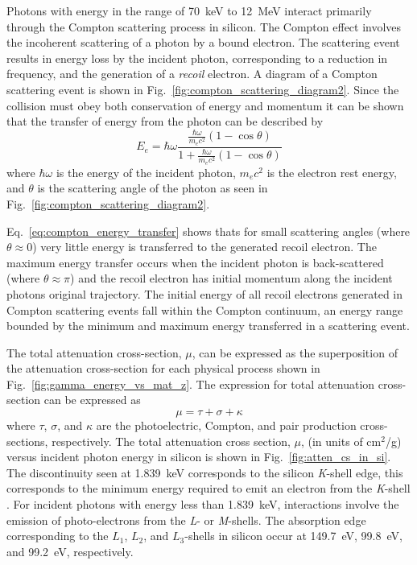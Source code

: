 Photons with energy in the range of 70~keV to 12~MeV interact primarily through the Compton scattering process in silicon.
The Compton effect involves the incoherent scattering of a photon by a bound electron.
The scattering event results in energy loss by the incident photon, corresponding to a reduction in frequency, and the generation of a \emph{recoil} electron.
A diagram of a Compton scattering event is shown in Fig.~\ref{fig:compton_scattering_diagram2}.
Since the collision must obey both conservation of energy and momentum it can be shown that the transfer of energy from the photon can be described by
\begin{equation}
    \label{eq:compton_energy_transfer}
    E_{e} = \hbar \omega \frac{\frac{\hbar \omega}{m_{e} c^2}(1-\cos\theta)}{1 + \frac{\hbar \omega}{m_e c^2}(1-\cos\theta)}
\end{equation}
where $\hbar \omega$ is the energy of the incident photon, $m_{e}c^2$ is the electron rest energy, and $\theta$ is the scattering angle of the photon as seen in Fig.~\ref{fig:compton_scattering_diagram2}.

Eq.~\ref{eq:compton_energy_transfer} shows thats for small scattering angles (where $\theta \approx 0$) very little energy is transferred to the generated recoil electron.
The maximum energy transfer occurs when the incident photon is back-scattered (where $\theta \approx \pi$) and the recoil electron has initial momentum along the incident photons original trajectory.
The initial energy of all recoil electrons generated in Compton scattering events fall within the Compton continuum, an energy range bounded by the minimum and maximum energy transferred in a scattering event.

The total attenuation cross-section, $\mu$, can be expressed as the superposition of the attenuation cross-section for each physical process shown in Fig.~\ref{fig:gamma_energy_vs_mat_z}.
The expression for total attenuation cross-section can be expressed as 
\begin{equation}
    \label{eq:total_photon_cs}
    \mu = \tau + \sigma + \kappa
\end{equation}
where $\tau$, $\sigma$, and $\kappa$ are the photoelectric, Compton, and pair production cross-sections, respectively.
The total attenuation cross section, $\mu$, (in units of cm$^2$/g) versus incident photon energy in silicon is shown in Fig.~\ref{fig:atten_cs_in_si}.
The discontinuity seen at 1.839~keV corresponds to the silicon \emph{K}-shell edge, this corresponds to the minimum energy required to emit an electron from the \emph{K}-shell \cite{Henke:1993tq}.
For incident photons with energy less than 1.839~keV, interactions involve the emission of photo-electrons from the \emph{L}- or \emph{M}-shells.
The absorption edge corresponding to the $L_1$, $L_2$, and $L_3$-shells in silicon occur at 149.7~eV, 99.8~eV, and 99.2~eV, respectively.

